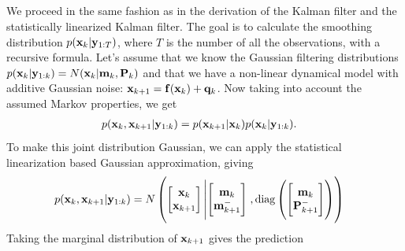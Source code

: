 \documentclass[a4paper,oneside,article]{memoir}
\begin{document}
\begin{table}[h]
	\centering
	
	\label{table:rmse7_2}
\end{table}





\subsection{}\label{sec:7_3}
\subsubsection{}\label{sec:7_3a}
We proceed in the same fashion as in the derivation of the Kalman filter and the statistically linearized
Kalman filter. The goal is to calculate the smoothing distribution $p(\mathbf{x}_k|\mathbf{y}_{1:T})$, where $T$ is the number
of all the observations, with a recursive formula. Let's assume that we know the Gaussian filtering distributions $p(\mathbf{x}_k|\mathbf{y}_{1:k})=N(\mathbf{x}_k|\mathbf{m}_k,\mathbf{P}_k)$
and that we have a non-linear dynamical model with additive Gaussian noise: $\mathbf{x}_{k+1}=\mathbf{f}(\mathbf{x}_{k})+\mathbf{q}_{k}$. Now taking
into account the assumed Markov properties, we get
\begin{align}
	p(\mathbf{x}_k,\mathbf{x}_{k+1}|\mathbf{y}_{1:k})&=p(\mathbf{x}_{k+1}|\mathbf{x}_k)p(\mathbf{x}_k|\mathbf{y}_{1:k}).
\end{align}
To make this joint distribution Gaussian, we can apply the statistical linearization based Gaussian approximation, giving
\begin{align}
	p(\mathbf{x}_k,\mathbf{x}_{k+1}|\mathbf{y}_{1:k})&=
	N\left(
	\begin{bmatrix}
		\mathbf{x}_k\\\mathbf{x}_{k+1}
	\end{bmatrix}\left\vert
	\begin{bmatrix}
		\mathbf{m}_{k}\\
		\mathbf{m}_{k+1}^-
	\end{bmatrix}
	\right.,
	\textrm{diag}\left(
	\begin{bmatrix}
		\mathbf{m}_{k}\\
		\mathbf{P}_{k+1}^-
	\end{bmatrix}
	\right)\right)
\end{align}
Taking the marginal distribution of $\mathbf{x}_{k+1}$ gives the prediction
\end{document}
